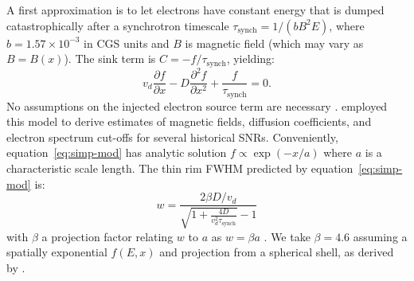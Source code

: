 \documentclass[iop, apj, numberedappendix, twocolappendix]{emulateapj}
\newcommand*{\mt}{\mathrm}
\newcommand*{\ptl}{\partial}
\newcommand*{\tsynch}{\tau_{\mt{synch}}}
\begin{document}
A first approximation is to let electrons have constant energy that is dumped
catastrophically after a synchrotron timescale $\tsynch = 1/(b B^2 E)$, where
$b = 1.57 \times 10^{-3}$ in CGS units and $B$ is magnetic field (which may
vary as $B=B(x)$).  The sink term is $C = -f / \tsynch$, yielding:
\begin{equation} \label{eq:simp-mod}
    v_d \frac{\ptl f}{\ptl x} - D \frac{\ptl^2 f}{\ptl x^2} +
    \frac{f}{\tau_{\mt{synch}}} = 0 .
\end{equation}
No assumptions on the injected electron source term are necessary
.
\citet{parizot2006} employed this model to derive estimates of magnetic fields,
diffusion coefficients, and electron spectrum cut-offs for several historical
SNRs.  Conveniently, equation~\eqref{eq:simp-mod} has analytic solution $f
\propto \exp(-x/a)$ where $a$ is a characteristic scale length.  The thin rim
FWHM predicted by equation~\eqref{eq:simp-mod} is:
\begin{equation} \label{eq:simp-fwhm}
    w = \frac{2\beta D / v_d}{\sqrt{1 +\frac{4D}{v_d^2 \tsynch}} - 1}
\end{equation}
with $\beta$ a projection factor relating $w$ to $a$ as $w = \beta a$
\citep{berezhko2004, parizot2006}.  We take $\beta = 4.6$ assuming a spatially
exponential $f(E,x)$ and projection from a spherical shell, as derived by
\citet{ballet2006}.
\end{document}
